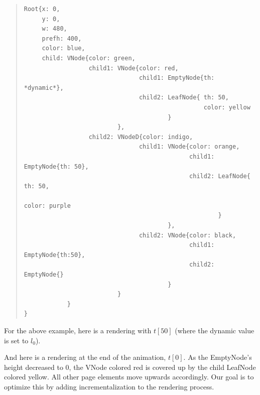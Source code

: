 \documentclass[11pt]{article}
\begin{document}
\begin{quote}
\begin{lstlisting}
Root{x: 0,
	 y: 0,
	 w: 480,
	 prefh: 400,
	 color: blue,
	 child: VNode{color: green,
				  child1: VNode{color: red,
							    child1: EmptyNode{th: *dynamic*},
								child2: LeafNode{ th: 50,
												  color: yellow
										}
						  },
				  child2: VNodeD{color: indigo,
							    child1: VNode{color: orange,
											  child1: EmptyNode{th: 50},
											  child2: LeafNode{ th: 50,
															    color: purple
													  }
										},
								child2: VNode{color: black,
											  child1: EmptyNode{th:50},
											  child2: EmptyNode{}
										}
						  }
			}
}
\end{lstlisting}
\end{quote}

For the above example, here is a rendering with $t[50]$ (where the dynamic value is set to $l_0$).

\begin{center} \setlength\fboxsep{0pt}
\setlength\fboxrule{0.5pt}
\end{center}

And here is a rendering at the end of the animation, $t[0]$. As the EmptyNode's height decreased to 0, the VNode colored red is covered up by the child LeafNode colored yellow. All other page elements move upwards accordingly. Our goal is to optimize this by adding incrementalization to the rendering process.

\begin{center} \setlength\fboxsep{0pt}
\setlength\fboxrule{0.5pt}
\end{center}
\end{document}
